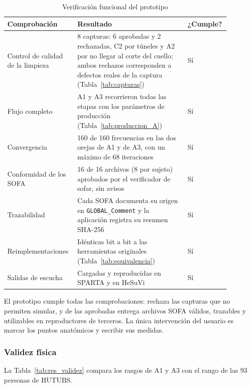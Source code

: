\begin{table}[H]
\centering
\small
\caption{Verificación funcional del prototipo}
\label{tab:res_funcional}
\begin{tabular}{p{0.30\linewidth}p{0.48\linewidth}p{0.12\linewidth}}
\hline
Comprobación & Resultado & ¿Cumple? \\
\hline
Control de calidad de la limpieza & 8 capturas: 6 aprobadas y 2 rechazadas, C2 por túneles y A2 por no llegar al corte del cuello; ambos rechazos corresponden a defectos reales de la captura (Tabla~\ref{tab:capturas}) & Sí \\
Flujo completo & A1 y A3 recorrieron todas las etapas con los parámetros de producción (Tabla~\ref{tab:produccion_A}) & Sí \\
Convergencia & 160 de 160 frecuencias en las dos orejas de A1 y de A3, con un máximo de 68 iteraciones & Sí \\
Conformidad de los SOFA & 16 de 16 archivos (8 por sujeto) aprobados por el verificador de sofar, sin avisos & Sí \\
Trazabilidad & Cada SOFA documenta su origen en \texttt{GLOBAL\_Comment} y la aplicación registra su resumen SHA-256 & Sí \\
Reimplementaciones & Idénticas bit a bit a las herramientas originales (Tabla~\ref{tab:equivalencia}) & Sí \\
Salidas de escucha & Cargadas y reproducidas en SPARTA y en HeSuVi & Sí \\
\hline
\end{tabular}
\end{table}

El prototipo cumple todas las comprobaciones: rechaza las capturas que no permiten simular, y de las aprobadas entrega archivos SOFA válidos, trazables y utilizables en reproductores de terceros. La única intervención del usuario es marcar los puntos anatómicos y escribir sus medidas.

\subsubsection{Validez física}
\label{subsubsec:res_validez}

La Tabla~\ref{tab:res_validez} compara los rasgos de A1 y A3 con el rango de las 93 personas de HUTUBS.

